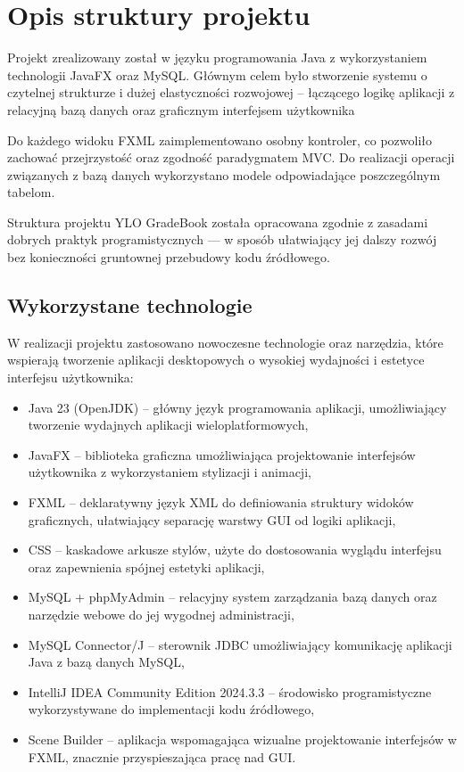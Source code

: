 \chapter{Opis struktury projektu}
\label{cha:opisStrukturyProjektu}

Projekt zrealizowany został w języku programowania Java z wykorzystaniem technologii JavaFX oraz MySQL. Głównym celem było stworzenie systemu o czytelnej strukturze i dużej elastyczności rozwojowej – łączącego logikę aplikacji z relacyjną bazą danych oraz graficznym interfejsem użytkownika

Do każdego widoku FXML zaimplementowano osobny kontroler, co pozwoliło zachować przejrzystość oraz zgodność paradygmatem MVC. Do realizacji operacji związanych z bazą danych wykorzystano modele odpowiadające poszczególnym tabelom.

Struktura projektu YLO GradeBook została opracowana zgodnie z zasadami dobrych praktyk programistycznych — w sposób ułatwiający jej dalszy rozwój bez konieczności gruntownej przebudowy kodu źródłowego.


\section{Wykorzystane technologie}
W realizacji projektu zastosowano nowoczesne technologie oraz narzędzia, które wspierają tworzenie aplikacji desktopowych o wysokiej wydajności i estetyce interfejsu użytkownika:
\begin{itemize}
    \item Java 23 (OpenJDK) – główny język programowania aplikacji, umożliwiający tworzenie wydajnych aplikacji wieloplatformowych,
    \item JavaFX – biblioteka graficzna umożliwiająca projektowanie interfejsów użytkownika z wykorzystaniem stylizacji i animacji,
    \item FXML – deklaratywny język XML do definiowania struktury widoków graficznych, ułatwiający separację warstwy GUI od logiki aplikacji,
    \item CSS – kaskadowe arkusze stylów, użyte do dostosowania wyglądu interfejsu oraz zapewnienia spójnej estetyki aplikacji,
    \item MySQL + phpMyAdmin – relacyjny system zarządzania bazą danych oraz narzędzie webowe do jej wygodnej administracji,
    \item MySQL Connector/J – sterownik JDBC umożliwiający komunikację aplikacji Java z bazą danych MySQL,
    \item IntelliJ IDEA Community Edition 2024.3.3 – środowisko programistyczne wykorzystywane do implementacji kodu źródłowego,
    \item Scene Builder – aplikacja wspomagająca wizualne projektowanie interfejsów w FXML, znacznie przyspieszająca pracę nad GUI.
\end{itemize}

